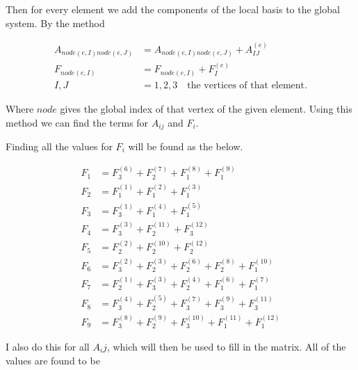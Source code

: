 \documentclass[9pt]{amsart}
\begin{document}
Then for every element we add the components of the local basis to the global
system. By the method

\begin{align*}
  A_{node(e,I)node(e,J)}&=A_{node(e,I)node(e,J)}+A_{IJ}^{(e)}\\
  F_{node(e,I)}&=F_{node(e,I)}+F_I^{(e)}\\
  I,J&=1,2,3\quad\text{the vertices of that element.}
\end{align*}

Where $node$ gives the global index of that vertex of the given element. Using
this method we can find the terms for $A_{ij}$ and $F_{i}$.

Finding all the values for $F_i$ will be found as the below.

\begin{align*}
  F_{1}&=F_3^{(6)}+F_2^{(7)}+F_1^{(8)}+F_1^{(9)}\\
  F_2&=F_1^{(1)}+F_1^{(2)}+F_1^{(3)}\\
  F_3&=F_3^{(1)}+F_1^{(4)}+F_1^{(5)}\\
  F_4&=F_3^{(3)}+F_2^{(11)}+F_3^{(12)}\\
  F_5&=F_2^{(2)}+F_2^{(10)}+F_2^{(12)}\\
  F_6&=F_3^{(2)}+F_2^{(3)}+F_2^{(6)}+F_2^{(8)}+F_1^{(10)}\\
  F_7&=F_2^{(1)}+F_3^{(3)}+F_2^{(4)}+F_1^{(6)}+F_1^{(7)}\\
  F_8&=F_3^{(4)}+F_2^{(5)}+F_3^{(7)}+F_3^{(9)}+F_3^{(11)}\\
  F_9&=F_3^{(8)}+F_2^{(9)}+F_3^{(10)}+F_1^{(11)}+F_1^{(12)}
\end{align*}

I also do this for all $A_ij$, which will then be used to fill in the matrix.
All of the values are found to be
\end{document}
